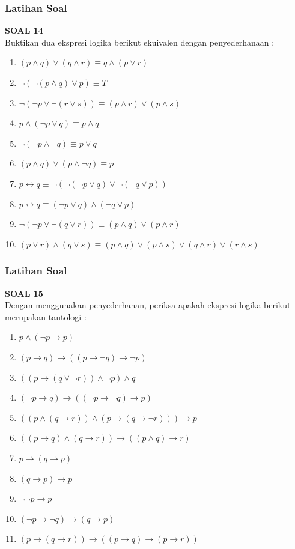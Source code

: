 \documentclass[handout]{beamer}
\theoremstyle{definition}
\theoremstyle{example}
\begin{document}
\begin{frame}[shrink]
	\frametitle{Latihan Soal}
	\textbf{SOAL 14}\\
	Buktikan dua ekspresi logika berikut ekuivalen dengan penyederhanaan :\\
	\begin{enumerate}
		\item $ (p \wedge q)\vee (q \wedge r) \equiv q \wedge (p \vee r) $
		\item $ \neg(\neg(p \wedge q)\vee p) \equiv T$
		\item $\neg(\neg p \vee \neg(r \vee s))\equiv (p \wedge r)\vee (p \wedge s)$	
		\item $p \wedge (\neg p \vee q)\equiv p \wedge q$
		\item $\neg(\neg p \wedge \neg q)\equiv p \vee q$
		\item $(p \wedge q)\vee(p \wedge \neg q)\equiv p$
		\item $p \leftrightarrow q \equiv \neg(\neg(\neg p \vee q)\vee \neg(\neg q \vee p)) $
		\item $p \leftrightarrow q \equiv (\neg p \vee q) \wedge (\neg q \vee p) $
		\item $ \neg(\neg p \vee \neg(q \vee r))\equiv (p \wedge q) \vee (p \wedge r) $
		\item $(p \vee r)\wedge(q \vee s)\equiv (p \wedge q)\vee(p \wedge s)\vee(q \wedge r)\vee(r \wedge s) $			
	\end{enumerate}	
\end{frame}

\begin{frame}
	\frametitle{Latihan Soal}
	\textbf{SOAL 15}\\
	Dengan menggunakan penyederhanan, periksa apakah ekspresi logika berikut merupakan tautologi :\\
	\begin{enumerate}
		\item $p \wedge (\neg p \rightarrow p) $
		\item $(p \rightarrow q)\rightarrow((p \rightarrow \neg q)\rightarrow \neg p) $	
		\item $((p \rightarrow (q \vee \neg r))\wedge \neg p)\wedge q $
		\item $(\neg p \rightarrow q)\rightarrow((\neg p \rightarrow \neg q)\rightarrow p) $	
		\item $((p \wedge (q \rightarrow r))\wedge(p \rightarrow(q \rightarrow \neg r)))\rightarrow p $
		\item $((p \rightarrow q)\wedge(q \rightarrow r))\rightarrow((p \wedge q)\rightarrow r) $
		\item $p \rightarrow (q \rightarrow p) $
		\item $(q \rightarrow p) \rightarrow p $
		\item $\neg \neg p \rightarrow p$
		\item $(\neg p \rightarrow \neg q)\rightarrow(q \rightarrow p)$	
		\item $(p \rightarrow (q \rightarrow r))\rightarrow((p \rightarrow q)\rightarrow(p \rightarrow r))$			
	\end{enumerate}	
\end{frame}
\end{document}
